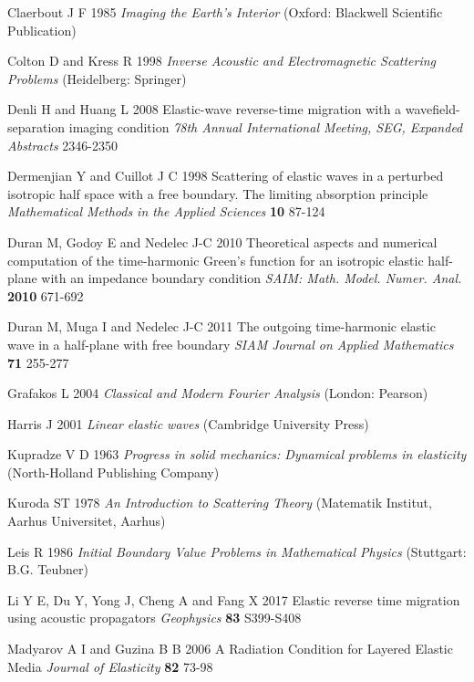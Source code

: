 \documentclass[12pt]{iopart}
\begin{document}
{\begin{thebibliography}{99}
	{Claerbout J F } 1985  { \em Imaging the Earth's Interior} (Oxford: Blackwell Scientific Publication)
	
	Colton D  and   Kress R 1998 {\em Inverse Acoustic and Electromagnetic Scattering Problems } (Heidelberg: Springer)
	
	Denli H and Huang L 2008
	{Elastic-wave reverse-time migration with a wavefield-separation imaging condition}
	{\it 78th Annual International Meeting, SEG, Expanded Abstracts} 2346-2350
	
	Dermenjian Y and Cuillot J C 1998
	{Scattering of elastic waves in a perturbed isotropic half space with a free boundary. The limiting absorption principle}
	{\it Mathematical Methods in the Applied Sciences} {\bf 10} 87-124
	
	Duran M, Godoy E and Nedelec J-C 2010
	Theoretical aspects and numerical computation of the time-harmonic Green's function
	for an isotropic elastic half-plane with an impedance boundary condition
	{\it SAIM: Math. Model. Numer. Anal.} {\bf 2010} 671-692
	
	Duran M, Muga I and Nedelec J-C 2011
	{The outgoing time-harmonic elastic wave in a half-plane with free boundary}
	{\it SIAM Journal on Applied Mathematics} {\bf 71} 255-277
	
	{Grafakos L} 2004 {\em Classical and Modern Fourier Analysis } (London: Pearson)
	
	Harris J 2001 {\em Linear elastic waves} {(Cambridge University Press)}
	
	Kupradze V D 1963 {\em Progress in solid mechanics: Dynamical problems in elasticity} {(North-Holland Publishing Company)}
	
	Kuroda ST 1978 {\em An Introduction to Scattering Theory} (Matematik Institut, Aarhus Universitet, Aarhus)
	
	{Leis R} 1986 {\em Initial Boundary Value Problems in Mathematical Physics} {(Stuttgart: B.G. Teubner)}
	
	Li Y E, Du Y, Yong J, Cheng A and Fang X 2017 Elastic reverse time migration using acoustic propagators {\it Geophysics} {\bf 83} S399-S408
	
	Madyarov A I and Guzina B B 2006 {A Radiation Condition for Layered Elastic Media} {\it Journal of Elasticity} {\bf 82} 73-98
	

\end{thebibliography}}
\end{document}
